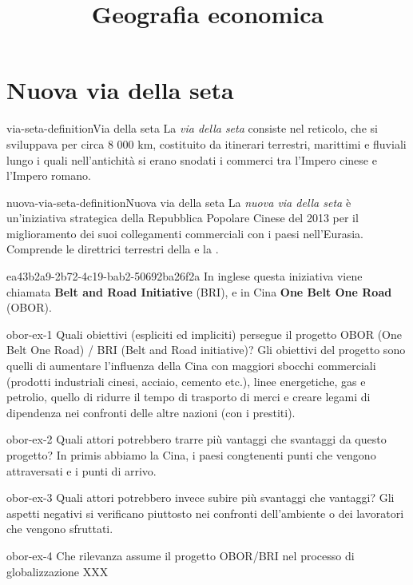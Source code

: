 \documentclass[preview]{standalone}
\begin{document}
\title{Geografia economica}
\genpage

\section{Nuova via della seta}

\begin{snippetdefinition}{via-seta-definition}{Via della seta}
    La \textit{via della seta} consiste nel reticolo, che si sviluppava per circa 8 000 km,
    costituito da itinerari terrestri, marittimi e fluviali lungo i quali nell'antichità si
    erano snodati i commerci tra l'Impero cinese e l'Impero romano.
\end{snippetdefinition}

\begin{snippetdefinition}{nuova-via-seta-definition}{Nuova via della seta}
    La \textit{nuova via della seta} è un'iniziativa strategica della Repubblica
    Popolare Cinese del 2013 per il miglioramento dei suoi collegamenti commerciali con
    i paesi nell'Eurasia. Comprende le direttrici terrestri della 
    e la .
\end{snippetdefinition}

\begin{snippet}{ea43b2a9-2b72-4c19-bab2-50692ba26f2a}
    In inglese questa iniziativa viene chiamata \textbf{Belt and Road Initiative} (BRI),
e in Cina \textbf{One Belt One Road} (OBOR).
\end{snippet}

\begin{snippetexercise}{obor-ex-1}
    {Quali obiettivi (espliciti ed impliciti) persegue il progetto OBOR (One Belt One Road) / BRI (Belt and Road initiative)?}
    Gli obiettivi del progetto sono quelli di aumentare l'influenza della Cina
    con maggiori sbocchi commerciali (prodotti industriali cinesi, acciaio, cemento etc.),
    linee energetiche, gas e petrolio, quello di ridurre il tempo di trasporto di merci
    e creare legami di dipendenza nei confronti delle altre nazioni (con i prestiti).
\end{snippetexercise}

\begin{snippetexercise}{obor-ex-2}
    {Quali attori potrebbero trarre più vantaggi che svantaggi da questo progetto?}
    In primis abbiamo la Cina, i paesi congtenenti punti che vengono attraversati
    e i punti di arrivo.
\end{snippetexercise}

\begin{snippetexercise}{obor-ex-3}
    {Quali attori potrebbero invece subire più svantaggi che vantaggi?}
    Gli aspetti negativi si verificano piuttosto nei confronti dell'ambiente o
    dei lavoratori che vengono sfruttati.
\end{snippetexercise}

\begin{snippetexercise}{obor-ex-4}
    {Che rilevanza assume il progetto OBOR/BRI nel processo di globalizzazione}
    XXX
\end{snippetexercise}
\end{document}
